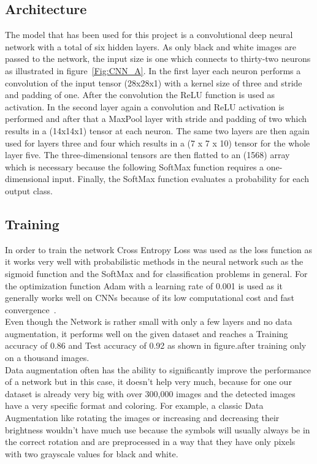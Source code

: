 \documentclass[@CLASSOPTIONS@]{tumarticle}
\begin{document}
\subsection{Architecture}

The model that has been used for this project is a convolutional deep neural network with a total of six hidden layers.
As only black and white images are passed to the network, the input size is one which connects to thirty-two neurons as
illustrated in figure~\ref{Fig:CNN_A}. In the first layer each neuron performs a convolution of the input tensor (28x28x1) with
a kernel size of three and stride and padding of one.
After the convolution the ReLU function is used as activation.
In the second layer again a convolution and ReLU activation is performed and after that a MaxPool layer with stride and
padding of two which results in a (14x14x1) tensor at each neuron. The same two layers are then again used for layers three and four which results in a (7 x 7 x 10) tensor for the whole
layer five. The three-dimensional tensors are then flatted to an (1568) array which is necessary because the following SoftMax
function requires a one-dimensional input. Finally, the SoftMax function evaluates a probability for each output class.

\subsection{Training}

In order to train the network Cross Entropy Loss was used as the loss function as it works very well with probabilistic
methods in the neural network such as the sigmoid function and the SoftMax and for classification problems in general.
For the optimization function Adam with a learning rate of 0.001 is used as it generally works well on CNNs because of
its low computational cost and fast convergence~\cite{Adam}.\\
Even though the Network is rather small with only a few layers and no
data augmentation, it performs well on the given dataset and reaches a Training accuracy of 0.86 and Test accuracy of
0.92 as shown in figure.after training only on a thousand images.\\
Data augmentation often has the ability to
significantly improve the performance of a network but in this case, it doesn’t help very much, because for one our
dataset is already very big with over 300,000 images and the detected images have a very specific format and coloring.
For example, a classic Data Augmentation like rotating the images or increasing and decreasing their brightness wouldn’t
have much use because the symbols will usually always be in the correct rotation and are preprocessed in a way that they
have only pixels with two grayscale values for black and white.
\end{document}
